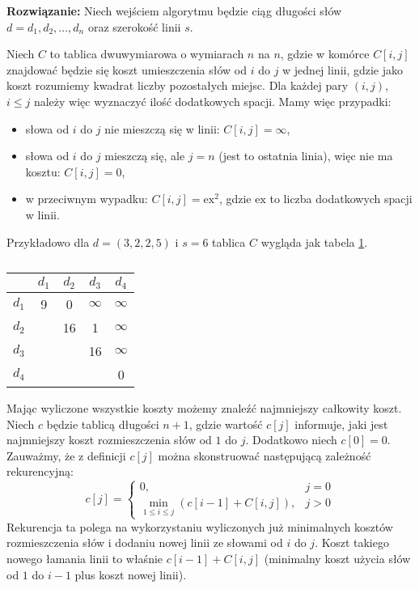 \textbf{Rozwiązanie:} Niech wejściem algorytmu będzie ciąg  długości słów $d=d_1,d_2,\dotsc,d_n$ oraz szerokość linii $s$.

Niech $C$ to tablica dwuwymiarowa o wymiarach $n$ na $n$, gdzie w komórce $C[i,j]$ znajdować będzie się koszt umieszczenia słów od $i$ do $j$ w jednej linii, gdzie jako koszt rozumiemy kwadrat liczby pozostałych miejsc. Dla każdej pary $(i,j)$, $i\leq j$ należy więc wyznaczyć ilość dodatkowych spacji. Mamy więc przypadki: \begin{itemize}
	\item słowa od $i$ do $j$ nie mieszczą się w linii: $C[i,j]=\infty$,
	\item słowa od $i$ do $j$ mieszczą się, ale $j=n$ (jest to ostatnia linia), więc nie ma kosztu: $C[i,j]=0$,
	\item w przeciwnym wypadku: $C[i,j]=\textrm{ex}^2$, gdzie $\textrm{ex}$ to liczba dodatkowych spacji w linii.
\end{itemize}

Przykładowo dla $d=(3,2,2,5)$ i $s=6$ tablica $C$ wygląda jak tabela \ref{tab_zad13_C}.
\begin{table}[H]
	\centering
	\def\arraystretch{1.25}
	\begin{tabular}{|c|cccc|}
		\hline \diagbox{$i$}{$j$}
		& \multicolumn{1}{c|}{$d_1$} & \multicolumn{1}{c|}{$d_2$} & \multicolumn{1}{c|}{$d_3$} & \multicolumn{1}{c|}{$d_4$} \\ \hline
		$d_1$ & 9 & 0  & $\infty$ & $\infty$ \\ \cline{1-1}
		$d_2$ &   & 16 &        1 & $\infty$ \\ \cline{1-1}
		$d_3$ &   &    &       16 & $\infty$ \\ \cline{1-1}
		$d_4$ &   &    &          &        0 \\ \cline{1-1}
		\hline
	\end{tabular}
	\caption{}
	\label{tab_zad13_C}
\end{table}

Mając wyliczone wszystkie koszty możemy znaleźć najmniejszy całkowity koszt. Niech $c$ będzie tablicą długości $n+1$, gdzie wartość $c[j]$ informuje, jaki jest najmniejszy koszt rozmieszczenia słów od $1$ do $j$. Dodatkowo niech $c[0]=0$. Zauważmy, że z definicji $c[j]$ można skonstruować następującą zależność rekurencyjną: \[
	c[j]=\begin{cases}
		0, &j=0\\
		\min\limits_{1 \leq i \leq j}\left(c[i-1]+C[i,j]\right), &j>0
	\end{cases}
\]
Rekurencja ta polega na wykorzystaniu wyliczonych już minimalnych kosztów rozmieszczenia słów i dodaniu nowej linii ze słowami od $i$ do $j$. Koszt takiego nowego łamania linii to właśnie $c[i-1] + C[i,j]$ (minimalny koszt użycia słów od $1$ do $i-1$ plus koszt nowej linii).

